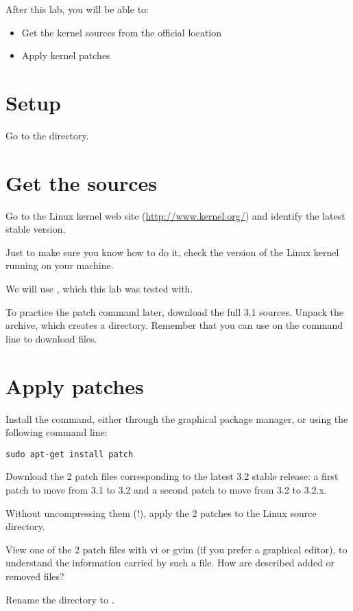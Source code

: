
After this lab, you will be able to:
\begin{itemize}
\item Get the kernel sources from the official location
\item Apply kernel patches
\end{itemize}

\section{Setup}

Go to the  directory.

\section{Get the sources}

Go to the Linux kernel web site (\url{http://www.kernel.org/}) and
identify the latest stable version.

Just to make sure you know how to do it, check the version of the
Linux kernel running on your machine.

We will use , which this lab was tested with.

To practice the patch command later, download the full 3.1
sources. Unpack the archive, which creates a 
directory. Remember that you can use  on the command
line to download files.

\section{Apply patches}

Install the  command, either through the graphical package
manager, or using the following command line:

\begin{verbatim}
sudo apt-get install patch
\end{verbatim}

Download the 2 patch files corresponding to the latest 3.2 stable
release: a first patch to move from 3.1 to 3.2 and a second patch to
move from 3.2 to 3.2.x.

Without uncompressing them (!), apply the 2 patches to the Linux
source directory.

View one of the 2 patch files with vi or gvim (if you prefer a
graphical editor), to understand the information carried by such a
file. How are described added or removed files?

Rename the  directory to .
